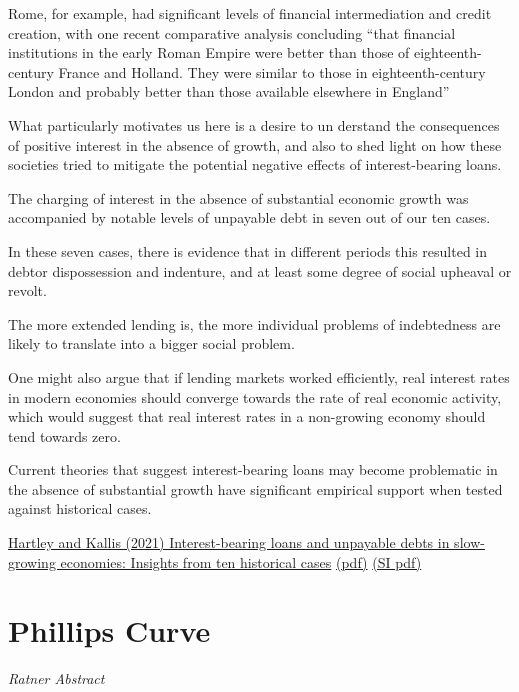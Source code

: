 \documentclass[
]{book}
\begin{document}
Rome,
for example, had significant levels of financial intermediation and credit
creation, with one recent comparative analysis concluding ``that financial
institutions in the early Roman Empire were better than those of
eighteenth- century France and Holland. They were similar to those in
eighteenth-century London and probably better than those available
elsewhere in England''

What particularly motivates us here is a desire to un­
derstand the consequences of positive interest in the absence of growth,
and also to shed light on how these societies tried to mitigate the
potential negative effects of interest-bearing loans.

The charging of interest in the absence
of substantial economic growth was accompanied by notable levels of
unpayable debt in seven out of our ten cases.

In these seven
cases, there is evidence that in different periods this resulted in debtor
dispossession and indenture, and at least some degree of social upheaval
or revolt.

The more extended lending is, the more individual problems of
indebtedness are likely to translate into a bigger social problem.

One might also argue
that if lending markets worked efficiently, real interest rates in modern
economies should converge towards the rate of real economic activity,
which would suggest that real interest rates in a non-growing economy
should tend towards zero.

Current theories that
suggest interest-bearing loans may become problematic in the absence
of substantial growth have significant empirical support when tested
against historical cases.

\href{https://www.sciencedirect.com/science/article/pii/S0921800921001907}{Hartley and Kallis (2021) Interest-bearing loans and unpayable debts in slow-growing economies: Insights from ten historical cases}
\href{pdf/Hartley_Kallis_2021_Unpayable_debt.pdf}{(pdf)}
\href{pdf/Hartley_Kallis_2021_Unpayable_debt_SI.pdf}{(SI pdf)}

\hypertarget{phillips-curve}{%
\chapter{Phillips Curve}\label{phillips-curve}}

\emph{Ratner Abstract}
\end{document}
